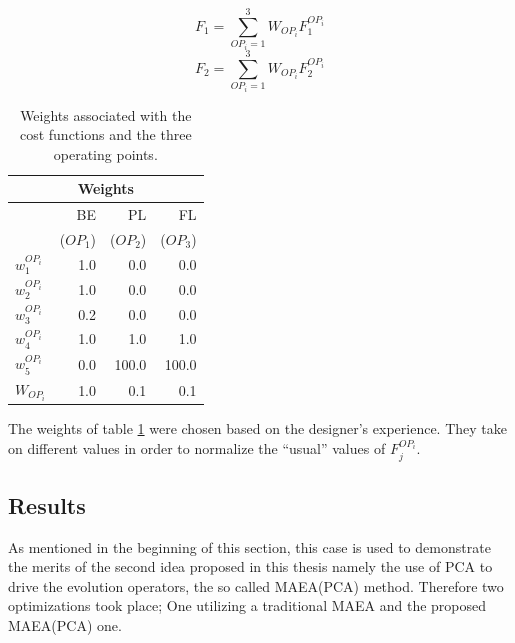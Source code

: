 \begin{equation} 
	\nonumber
   F_1=\sum_{OP_i=1}^{3}{W_{OP_i}F_1^{OP_i}}  
\end{equation}
\begin{equation} 
   F_2=\sum_{OP_i=1}^{3}{W_{OP_i}F_2^{OP_i}} 
\label{F12}
\end{equation}

\begin{table}[h!]
\begin{center}
\begin{tabular}{ |l|r|r|r| }
\hline
\multicolumn{4}{|c|}{Weights} \\
\hline
& BE & PL & FL\\
& ($OP_1$)     &  ($OP_2$)   & ($OP_3$)   \\
\hline 
\(w_1^{OP_i}\)	&1.0		&0.0		&0.0\\
\hline
\(w_2^{OP_i}\)	&1.0		&0.0		&0.0\\
\hline
\(w_3^{OP_i}\)	&0.2	&0.0		&0.0\\
\hline
\(w_4^{OP_i}\)	&1.0		&1.0		&1.0\\
\hline
\(w_5^{OP_i}\)	&0.0		&100.0	&100.0\\
\hline\hline
\(W_{OP_i}\)		&1.0		&0.1	&0.1\\
\hline
\end{tabular}
\caption{
Weights associated with the cost functions and the three operating points.}
\label{weights}
\end{center}
\end{table}

The weights of table \ref{weights} were chosen based on the designer's experience. They take on different values in order to normalize the ``usual'' values of $F_j^{OP_i}$.

\subsection{Results}
As mentioned in the beginning of this section, this case is used to demonstrate the merits of the second idea proposed in this thesis namely the use of PCA to drive the evolution operators, the so called MAEA(PCA) method. Therefore two optimizations took place; One utilizing a traditional MAEA and the proposed MAEA(PCA) one.

